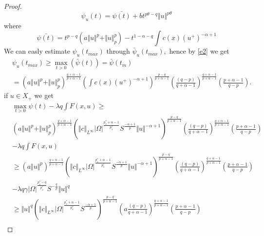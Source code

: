 \documentclass[10pt,twoside,reqno,centertags,draft]{amsart}
\begin{document}
\begin{proof}
\begin{equation*}
\psi_{u}(t) =\bar{\psi(t)} +  b t^{p \theta - q}\Vert u \Vert^{p \theta} 
\end{equation*}
where 
\begin{equation*}
\bar{\psi(t)} =t^{p-q}(a \Vert u \Vert^p + \Vert u \Vert_{p}^{p}) -t^{1 -\alpha -q} \int c(x)(u^+)^{-\alpha+1}
\end{equation*}
We can easly estimate $ \psi_{u}(t_{max})$ through $ \bar{\psi}_{u}(t_{max}),$ hence by \ref{e2} we get
{\footnotesize
\begin{equation}\label{e05}
\begin{aligned}
&\psi_{u}(t_{max}) \geq \max_{t >0}(\bar{\psi}(t)) =\bar{\psi}(t_m)\\
&=\left( a \Vert u \Vert^p + \Vert u \Vert_{p}^{p}\right)^{\frac{q+ \alpha-1}{p+ \alpha-1}}\left(\int c(x)(u^+)^{-\alpha+1}\right)^{\frac{p-q}{p+\alpha -1}}\left(\frac{(q-p)}{q+\alpha-1} \right)^{\frac{q+\alpha-1}{p+\alpha-1}}\left(\frac{p+\alpha -1}{q-p}\right).
\end{aligned}
\end{equation}
}
if  $u \in  X_+$ we get
{\tiny
\begin{equation}
\begin{aligned}
&\max_{t >0} \psi(t) - \lambda q \int F(x,u) \geq \\
&\left( a \Vert u \Vert^p + \Vert u \Vert_{p}^{p}\right)^{\frac{q+ \alpha-1}{p+ \alpha-1}} \left( \Vert c \Vert_{L^{\infty}}\vert \Omega\vert^{\frac{p_s^* +\alpha -1}{p_s^*}}S^{\frac{-\alpha+1}{p}} \Vert u \Vert^{-\alpha+1} \right)^{\frac{p-q}{p+\alpha -1}}\left(\frac{(q-p)}{q+\alpha-1} \right)^{\frac{q+\alpha-1}{p+\alpha-1}}\left(\frac{p+\alpha -1}{q-p}\right)\\
& - \lambda q \int F(x,u)\\ 
&\geq \left( a \Vert u \Vert^p\right)^{\frac{q+ \alpha-1}{p+ \alpha-1}} \left( \Vert c \Vert_{L^{\infty}} \vert \Omega\vert^{\frac{p_s^* +\alpha -1}{p_s^*}}S^{\frac{-\alpha+1}{p}} \Vert u \Vert^{-\alpha+1} \right)^{\frac{p-q}{p+\alpha -1}}\left(\frac{(q-p)}{q+\alpha-1} \right)^{\frac{q+\alpha-1}{p+\alpha-1}}\left(\frac{p+\alpha -1}{q-p}\right)\\
& - \lambda q \gamma \vert \Omega \vert^{\frac{p_s^*-q}{p_s^*}}S^{-\frac{q}{p}} \Vert u \Vert^{q}\\ 
&\geq\Vert u \Vert^q\left( \Vert c \Vert_{L^{\infty}}\vert \Omega\vert^{\frac{p_s^* +\alpha -1}{p_s^*}}S^{\frac{-\alpha+1}{p}}\right)^{\frac{p-q}{p+\alpha -1}}\left(a\frac{(q-p)}{q+\alpha-1} \right)^{\frac{q+\alpha-1}{p+\alpha-1}}\left(\frac{p+\alpha -1}{q-p}\right)\\

\end{aligned}
\end{equation}}
\end{proof}
\end{document}
